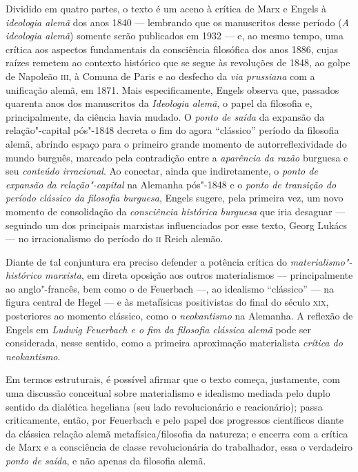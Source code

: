 Dividido em quatro partes, o texto é um aceno à
crítica de Marx e Engels à \emph{ideologia alemã} dos anos 1840 ---
lembrando que os manuscritos desse período (\emph{A ideologia
alemã}) somente serão publicados em 1932 --- e, ao mesmo tempo, uma crítica aos aspectos
fundamentais da consciência filosófica dos anos 1886, cujas raízes remetem ao contexto histórico que se segue às
revoluções de 1848, ao golpe de Napoleão \textsc{iii}, à Comuna de Paris e
ao desfecho da \emph{via prussiana} com a unificação alemã, em 1871. Mais especificamente, Engels observa que, passados quarenta anos dos manuscritos da \emph{Ideologia alemã}, o
papel da filosofia e, principalmente, da ciência havia mudado. O
\emph{ponto de saída} da expansão da relação"-capital pós"-1848 decreta o
fim do agora ``clássico'' período da filosofia alemã, abrindo espaço para
o primeiro grande momento de autorreflexividade do mundo burguês, marcado pela contradição entre a 
\emph{aparência da razão} burguesa e seu \emph{conteúdo irracional}. Ao
conectar, ainda que indiretamente, o \emph{ponto de
expansão da relação"-capital} na Alemanha pós"-1848 e o \emph{ponto de
transição do período clássico da filosofia burguesa}, Engels sugere,
pela primeira vez, um novo momento de consolidação da \emph{consciência
histórica burguesa} que iria desaguar --- seguindo um dos principais
marxistas influenciados por esse texto, Georg Lukács --- no irracionalismo
do período do \textsc{ii} Reich alemão.

Diante de tal conjuntura era preciso defender a potência crítica do
\emph{materialismo"-histórico marxista}, em direta oposição aos outros
materialismos --- principalmente ao anglo"-francês, bem como o de Feuerbach ---, ao
idealismo ``clássico'' --- na figura central de Hegel --- e às metafísicas
positivistas do final do século \textsc{xix}, posteriores ao momento clássico,
como o \emph{neokantismo} na Alemanha. A reflexão de Engels em \emph{Ludwig Feuerbach e o fim da filosofia clássica alemã} pode ser
considerada, nesse sentido, como a primeira aproximação materialista
\emph{crítica do neokantismo}.

Em termos estruturais, é possível afirmar que o texto começa, justamente,
com uma discussão conceitual sobre materialismo e idealismo mediada
pelo duplo sentido da dialética hegeliana (seu lado revolucionário
e reacionário); passa criticamente, então, por Feuerbach e pelo papel dos
progressos científicos diante da clássica relação alemã
metafísica/filosofia da natureza; e encerra com a crítica de Marx
e a consciência de classe revolucionária do trabalhador, essa o
verdadeiro \emph{ponto de saída}, e não apenas da filosofia alemã.

